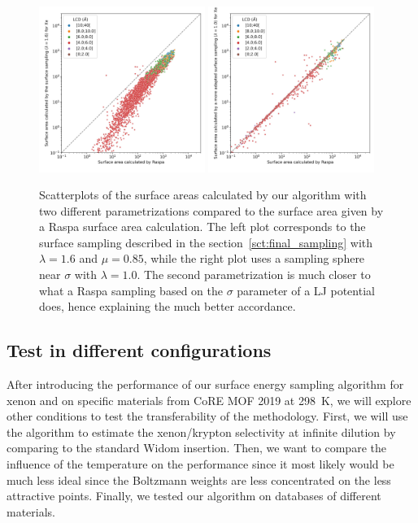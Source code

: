 \documentclass[main]{subfiles}
\begin{document}
\begin{figure}[ht]
  \centering
  \includegraphics[width=0.48\textwidth]{figures/3-fastsim/SA_raspa_Xe_m3_cm3_vs_SA_lambda_1.6_overview.jpg}
  \includegraphics[width=0.48\textwidth]{figures/3-fastsim/SA_raspa_Xe_m3_cm3_vs_SA_lambda_1.0_overview.jpg}
  \caption{Scatterplots of the surface areas calculated by our algorithm with two different parametrizations compared to the surface area given by a Raspa surface area calculation. The left plot corresponds to the surface sampling described in the section~\ref{sct:final_sampling} with $\lambda=1.6$ and $\mu=0.85$, while the right plot uses a sampling sphere near $\sigma$ with $\lambda=1.0$. The second parametrization is much closer to what a Raspa sampling based on the $\sigma$ parameter of a LJ potential does, hence explaining the much better accordance. }\label{fgr:surface_area}
\end{figure}

\subsection{Test in different configurations}

After introducing the performance of our surface energy sampling algorithm for xenon and on specific materials from CoRE MOF 2019 at \SI{298}{\kelvin}, we will explore other conditions to test the transferability of the methodology. First, we will use the algorithm to estimate the xenon/krypton selectivity at infinite dilution by comparing to the standard Widom insertion. Then, we want to compare the influence of the temperature on the performance since it most likely would be much less ideal since the Boltzmann weights are less concentrated on the less attractive points. Finally, we tested our algorithm on databases of different materials. 
\end{document}
